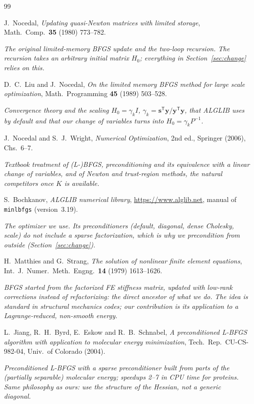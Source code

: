 \documentclass[11pt,a4paper]{article}
\theoremstyle{remark}
\newcommand{\s}{\bm{s}}
\newcommand{\y}{\bm{y}}
\newcommand{\T}{^{\mathsf T}}
\newcommand{\code}[1]{\texttt{#1}}
\begin{document}
\begin{thebibliography}{99}
\small
\newcommand{\why}[1]{\par\smallskip\noindent\begin{minipage}{\linewidth}\itshape #1\end{minipage}\par\medskip}

J.~Nocedal, \emph{Updating quasi-Newton matrices with limited storage},
Math.\ Comp.\ \textbf{35} (1980) 773--782.
\why{The original limited-memory BFGS update and the two-loop recursion. The recursion takes an
arbitrary initial matrix $H_0$; everything in Section~\ref{sec:change} relies on this.}

D.~C.~Liu and J.~Nocedal, \emph{On the limited memory BFGS method for large scale optimization},
Math.\ Programming \textbf{45} (1989) 503--528.
\why{Convergence theory and the scaling $H_0=\gamma_k I$, $\gamma_k=\s\T\y/\y\T\y$, that ALGLIB uses
by default and that our change of variables turns into $H_0=\gamma_k P^{-1}$.}

J.~Nocedal and S.~J.~Wright, \emph{Numerical Optimization}, 2nd ed., Springer (2006), Chs.~6--7.
\why{Textbook treatment of (L-)BFGS, preconditioning and its equivalence with a linear change of
variables, and of Newton and trust-region methods, the natural competitors once $K$ is available.}

S.~Bochkanov, \emph{ALGLIB numerical library}, \url{https://www.alglib.net}, manual of
\code{minlbfgs} (version~3.19).
\why{The optimizer we use. Its preconditioners (default, diagonal, dense Cholesky, scale) do not
include a sparse factorization, which is why we precondition from outside
(Section~\ref{sec:change}).}

H.~Matthies and G.~Strang, \emph{The solution of nonlinear finite element equations},
Int.\ J.\ Numer.\ Meth.\ Engng.\ \textbf{14} (1979) 1613--1626.
\why{BFGS started from the factorized FE stiffness matrix, updated with low-rank corrections instead
of refactorizing: the direct ancestor of what we do. The idea is standard in structural mechanics
codes; our contribution is its application to a Lagrange-reduced, non-smooth energy.}

L.~Jiang, R.~H.~Byrd, E.~Eskow and R.~B.~Schnabel, \emph{A preconditioned L-BFGS algorithm with
application to molecular energy minimization}, Tech.\ Rep.\ CU-CS-982-04, Univ.\ of Colorado (2004).
\why{Preconditioned L-BFGS with a sparse preconditioner built from parts of the (partially
separable) molecular energy; speedups 2--7 in CPU time for proteins. Same philosophy as ours: use
the structure of the Hessian, not a generic diagonal.}


\end{thebibliography}
\end{document}
